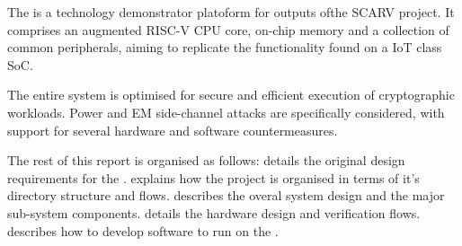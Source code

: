 
The \SCARVSOC is a technology demonstrator platoform for outputs ofthe 
SCARV project.
It comprises an augmented RISC-V CPU core, on-chip memory and a
collection of common peripherals, aiming to replicate the functionality
found on a IoT class SoC.

The entire system is optimised for secure and efficient execution of
cryptographic workloads.
Power and EM side-channel attacks are specifically considered,
with support for several hardware and software countermeasures.

The rest of this report is organised as follows:
 details the original design requirements for
the \SCARVSOC.
 explains how the project is organised in terms
of it's directory structure and flows.
 describes the overal system design and the major
sub-system components.
 details the hardware design and verification flows.
 describes how to develop software to run on
the \SCARVSOC.
